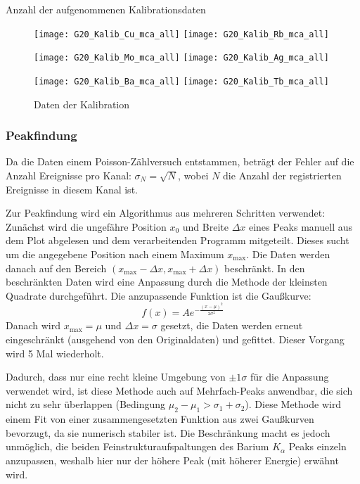 \documentclass{../Misc/MontavonLaTeX/Montavon}
\newcommand{\halfwidth}{0.48\textwidth}
\begin{document}
\begin{table}
\centering

\caption{Anzahl der aufgenommenen Kalibrationsdaten}
\label{tbl:KalibAnzahl}
\end{table}

\begin{figure}[H]
\centering
\texttt{[image: G20\_Kalib\_Cu\_mca\_all]}
\texttt{[image: G20\_Kalib\_Rb\_mca\_all]}

\texttt{[image: G20\_Kalib\_Mo\_mca\_all]}
\texttt{[image: G20\_Kalib\_Ag\_mca\_all]}

\texttt{[image: G20\_Kalib\_Ba\_mca\_all]}
\texttt{[image: G20\_Kalib\_Tb\_mca\_all]}
\caption{Daten der Kalibration}
\label{fig:KalibDaten}
\end{figure}

\subsubsection{Peakfindung}
Da die Daten einem Poisson-Zählversuch entstammen, beträgt der Fehler auf die Anzahl Ereignisse pro Kanal: $\sigma_N = \sqrt{N}$, wobei $N$ die Anzahl der registrierten Ereignisse in diesem Kanal ist.

Zur Peakfindung wird ein Algorithmus aus mehreren Schritten verwendet:
Zunächst wird die ungefähre Position $x_0$ und Breite $\Delta x$ eines Peaks manuell aus dem Plot abgelesen und dem verarbeitenden Programm mitgeteilt. Dieses sucht um die angegebene Position nach einem Maximum $x_\textrm{max}$. 
Die Daten werden danach auf den Bereich $(x_\textrm{max} - \Delta x, x_\textrm{max} + \Delta x)$ beschränkt.
In den beschränkten Daten wird eine Anpassung durch die Methode der kleinsten Quadrate durchgeführt. Die anzupassende Funktion ist die Gaußkurve:
\[
	f(x) = A e^{-\frac{(x-\mu)^2}{2 \sigma^2}}
\]
Danach wird $x_\textrm{max} = \mu$ und $\Delta x = \sigma$ gesetzt, die Daten werden erneut eingeschränkt (ausgehend von den Originaldaten) und gefittet.
Dieser Vorgang wird 5 Mal wiederholt. 

Dadurch, dass nur eine recht kleine Umgebung von $\pm 1 \sigma$ für die Anpassung verwendet wird,  ist diese Methode auch auf Mehrfach-Peaks anwendbar, die sich nicht zu sehr überlappen (Bedingung $\mu_2 - \mu_1 > \sigma_1 + \sigma_2$). Diese Methode wird einem Fit von einer zusammengesetzten Funktion aus zwei Gaußkurven bevorzugt, da sie numerisch stabiler ist. Die Beschränkung macht es jedoch unmöglich, die beiden Feinstrukturaufspaltungen des Barium $K_\alpha$ Peaks einzeln anzupassen, weshalb hier nur der höhere Peak (mit höherer Energie) erwähnt wird.
\end{document}
